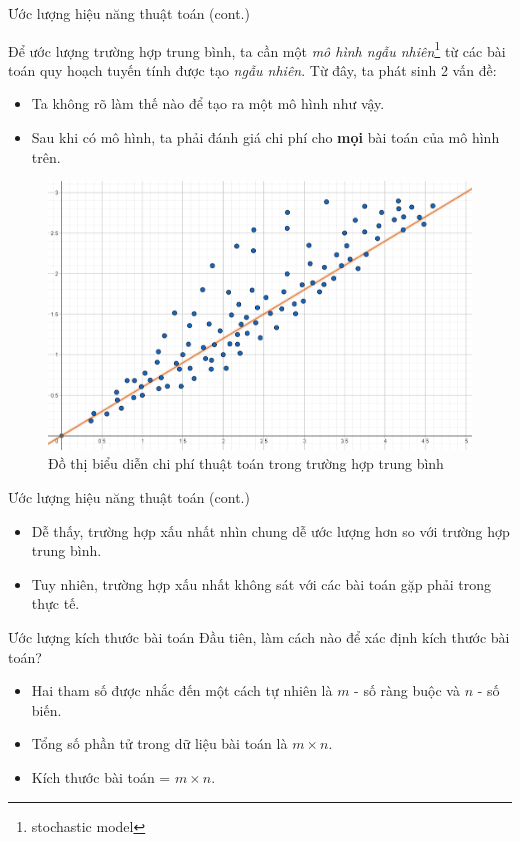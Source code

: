 \documentclass[10pt]{beamer}
\begin{document}
\begin{frame}{Ước lượng hiệu năng thuật toán (cont.)}
\begin{multicols}{2}
Để ước lượng  trường hợp trung bình, ta cần một \textit{mô hình ngẫu nhiên}\footnote{stochastic model} từ các bài toán quy hoạch tuyến tính được tạo \textit{ngẫu nhiên}. Từ đây, ta phát sinh 2 vấn đề:
\begin{itemize}
\item Ta không rõ làm thế nào để tạo ra một mô hình như vậy.
\item Sau khi có mô hình, ta phải đánh giá chi phí cho \textbf{mọi} bài toán của mô hình trên.
\end{itemize}
\columnbreak
\begin{figure}
\centering
\includegraphics[width=\linewidth]{img/average-case.png}
\caption{Đồ thị biểu diễn chi phí thuật toán trong trường hợp trung bình}
\end{figure}
\end{multicols}
\end{frame}

\begin{frame}{Ước lượng hiệu năng thuật toán (cont.)}
\begin{itemize}
\item Dễ thấy, trường hợp xấu nhất nhìn chung dễ ước lượng hơn so với trường hợp trung bình.
\item Tuy nhiên, trường hợp xấu nhất không sát với các bài toán gặp phải trong thực tế.
\end{itemize}
\end{frame}

\begin{frame}{Ước lượng kích thước bài toán}
Đầu tiên, làm cách nào để xác định kích thước bài toán?\\
\begin{itemize}
\item Hai tham số được nhắc đến một cách tự nhiên là $m$ - số ràng buộc và $n$ - số biến.
\item Tổng số phần tử trong dữ liệu bài toán là $m\times n$.
\item Kích thước bài toán = $m\times n$.
\end{itemize}
\end{frame}
\end{document}
